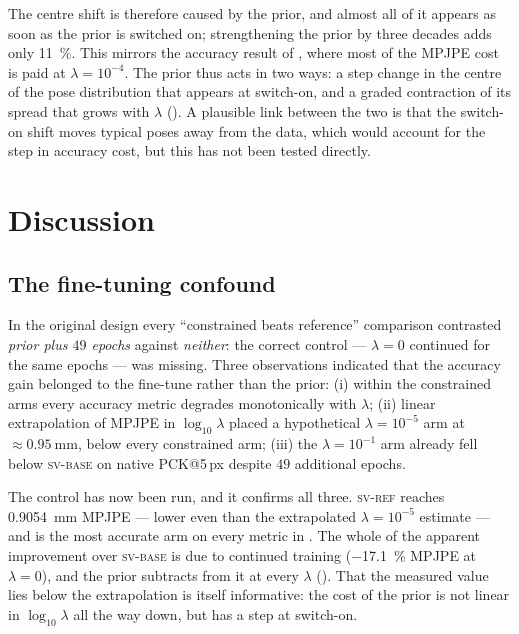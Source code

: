 \documentclass[11pt,a4paper]{article}
\newcommand{\lam}{\lambda}
\newcommand{\armref}{\textsc{sv-ref}}
\newcommand{\armbase}{\textsc{sv-base}}
\begin{document}
The centre shift is therefore caused by the prior, and almost all of it
appears as soon as the prior is switched on; strengthening the prior by three
decades adds only \SI{11}{\percent}. This mirrors the accuracy result of
, where most of the MPJPE cost is paid at $\lam = 10^{-4}$.
The prior thus acts in two ways: a step change in the centre of the pose
distribution that appears at switch-on, and a graded contraction of its spread
that grows with $\lam$ (). A plausible link between the two
is that the switch-on shift moves typical poses away from the data, which
would account for the step in accuracy cost, but this has not been tested
directly.

\section{Discussion}
\label{sec:discussion}

\subsection{The fine-tuning confound}
\label{sec:disc-confound}

In the original design every ``constrained beats reference'' comparison
contrasted \emph{prior plus $49$ epochs} against \emph{neither}: the correct
control --- $\lam = 0$ continued for the same epochs --- was missing. Three
observations indicated that the accuracy gain belonged to the fine-tune rather
than the prior: (i) within the constrained arms every accuracy metric degrades
monotonically with $\lam$; (ii) linear extrapolation of MPJPE in
$\log_{10}\lam$ placed a hypothetical $\lam = 10^{-5}$ arm at
$\approx\SI{0.95}{\milli\metre}$, below every constrained arm; (iii) the
$\lam = 10^{-1}$ arm already fell below \armbase{} on native PCK@5\,px despite
$49$ additional epochs.

The control has now been run, and it confirms all three. \armref{} reaches
\SI{0.9054}{\milli\metre} MPJPE --- lower even than the extrapolated
$\lam = 10^{-5}$ estimate --- and is the most accurate arm on every metric in
. The whole of the apparent improvement over \armbase{} is due
to continued training (\SI{-17.1}{\percent} MPJPE at $\lam = 0$), and the prior
subtracts from it at every $\lam$ (). That the measured value
lies below the extrapolation is itself informative: the cost of the prior is
not linear in $\log_{10}\lam$ all the way down, but has a step at switch-on.
\end{document}
